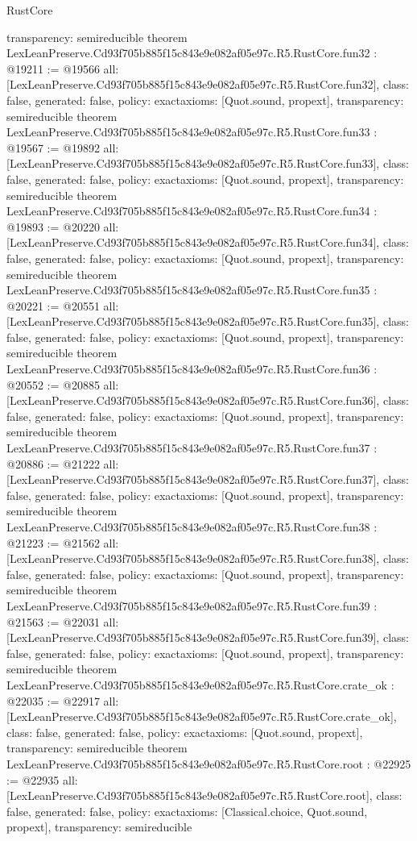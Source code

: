 \begin{lexlean}{RustCore}
\begin{coremodule}
{  transparency: semireducible
}
theorem LexLeanPreserve.Cd93f705b885f15c843e9e082af05e97c.R5.RustCore.fun32 : @19211 := @19566 {
  all: [LexLeanPreserve.Cd93f705b885f15c843e9e082af05e97c.R5.RustCore.fun32],
  class: false,
  generated: false,
  policy: exact{axioms: [Quot.sound, propext]},
  transparency: semireducible
}
theorem LexLeanPreserve.Cd93f705b885f15c843e9e082af05e97c.R5.RustCore.fun33 : @19567 := @19892 {
  all: [LexLeanPreserve.Cd93f705b885f15c843e9e082af05e97c.R5.RustCore.fun33],
  class: false,
  generated: false,
  policy: exact{axioms: [Quot.sound, propext]},
  transparency: semireducible
}
theorem LexLeanPreserve.Cd93f705b885f15c843e9e082af05e97c.R5.RustCore.fun34 : @19893 := @20220 {
  all: [LexLeanPreserve.Cd93f705b885f15c843e9e082af05e97c.R5.RustCore.fun34],
  class: false,
  generated: false,
  policy: exact{axioms: [Quot.sound, propext]},
  transparency: semireducible
}
theorem LexLeanPreserve.Cd93f705b885f15c843e9e082af05e97c.R5.RustCore.fun35 : @20221 := @20551 {
  all: [LexLeanPreserve.Cd93f705b885f15c843e9e082af05e97c.R5.RustCore.fun35],
  class: false,
  generated: false,
  policy: exact{axioms: [Quot.sound, propext]},
  transparency: semireducible
}
theorem LexLeanPreserve.Cd93f705b885f15c843e9e082af05e97c.R5.RustCore.fun36 : @20552 := @20885 {
  all: [LexLeanPreserve.Cd93f705b885f15c843e9e082af05e97c.R5.RustCore.fun36],
  class: false,
  generated: false,
  policy: exact{axioms: [Quot.sound, propext]},
  transparency: semireducible
}
theorem LexLeanPreserve.Cd93f705b885f15c843e9e082af05e97c.R5.RustCore.fun37 : @20886 := @21222 {
  all: [LexLeanPreserve.Cd93f705b885f15c843e9e082af05e97c.R5.RustCore.fun37],
  class: false,
  generated: false,
  policy: exact{axioms: [Quot.sound, propext]},
  transparency: semireducible
}
theorem LexLeanPreserve.Cd93f705b885f15c843e9e082af05e97c.R5.RustCore.fun38 : @21223 := @21562 {
  all: [LexLeanPreserve.Cd93f705b885f15c843e9e082af05e97c.R5.RustCore.fun38],
  class: false,
  generated: false,
  policy: exact{axioms: [Quot.sound, propext]},
  transparency: semireducible
}
theorem LexLeanPreserve.Cd93f705b885f15c843e9e082af05e97c.R5.RustCore.fun39 : @21563 := @22031 {
  all: [LexLeanPreserve.Cd93f705b885f15c843e9e082af05e97c.R5.RustCore.fun39],
  class: false,
  generated: false,
  policy: exact{axioms: [Quot.sound, propext]},
  transparency: semireducible
}
theorem LexLeanPreserve.Cd93f705b885f15c843e9e082af05e97c.R5.RustCore.crate_ok : @22035 := @22917 {
  all: [LexLeanPreserve.Cd93f705b885f15c843e9e082af05e97c.R5.RustCore.crate_ok],
  class: false,
  generated: false,
  policy: exact{axioms: [Quot.sound, propext]},
  transparency: semireducible
}
theorem LexLeanPreserve.Cd93f705b885f15c843e9e082af05e97c.R5.RustCore.root : @22925 := @22935 {
  all: [LexLeanPreserve.Cd93f705b885f15c843e9e082af05e97c.R5.RustCore.root],
  class: false,
  generated: false,
  policy: exact{axioms: [Classical.choice, Quot.sound, propext]},
  transparency: semireducible
}


\end{coremodule}
\end{lexlean}
